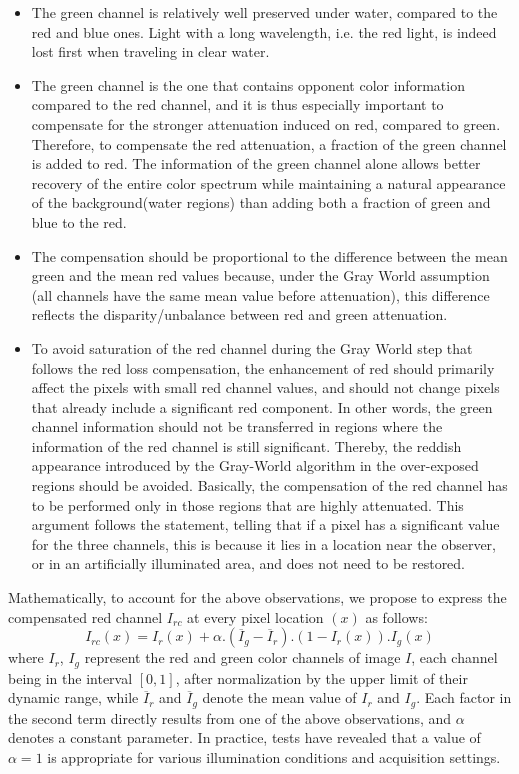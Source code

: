 \documentclass[hidelinks, 12pt]{report}
\begin{document}
\begin{itemize}
\item{The green channel is relatively well preserved under water, compared to the red and blue ones. Light with a long wavelength, i.e. the red light, is indeed lost first when traveling in clear water.}
\item{The green channel is the one that contains opponent color information compared to the red channel, and it is thus especially important to compensate for the stronger attenuation induced on red, compared to green. Therefore, to compensate the red attenuation, a fraction of the green channel is added to red. The information of the green channel alone allows better recovery of the entire color spectrum while maintaining a natural appearance of the background(water regions) than adding both a fraction of green and blue to the red.}
\item{The compensation should be proportional to the difference between the mean green and the mean red values because, under the Gray World assumption (all channels have the same mean value before attenuation), this difference reflects the disparity/unbalance between red and green attenuation.}
\item{To avoid saturation of the red channel during the Gray World step that follows the red loss compensation, the enhancement of red should primarily affect the pixels with small red channel values, and should not change pixels that already include a significant red component. In other words, the green channel information should not be transferred in regions where the information of the red channel is still significant. Thereby, the reddish appearance introduced by the Gray-World algorithm in the over-exposed regions should be avoided. Basically, the compensation of the red channel has to be performed only in those regions that are highly attenuated. This argument follows the statement, telling that if a pixel has a significant value for the three channels, this is because it lies in a location near the observer, or in an artificially illuminated area, and does not need to be restored.}
\end{itemize}
Mathematically, to account for the above observations, we propose to express the compensated red channel $I_{rc}$ at every pixel location $(x)$ as follows:
\begin{equation}
I_{rc}(x)=I_r(x)+\alpha.(\overline{I}_g-\overline{I}_r).(1-I_r(x)).I_g(x)
\end{equation}
where $I_r$, $I_g$ represent the red and green color channels of image $I$, each channel being in the interval $[0, 1]$, after normalization by the upper limit of their dynamic range, while $\overline{I}_r$ and $\overline{I}_g$ denote the mean value of $I_r$ and $I_g$. Each factor in the second term directly results from one of the above observations, and $\alpha$ denotes a constant parameter. In practice, tests have revealed that a value of $\alpha=1$ is appropriate for various illumination conditions and acquisition settings. \par
\end{document}
